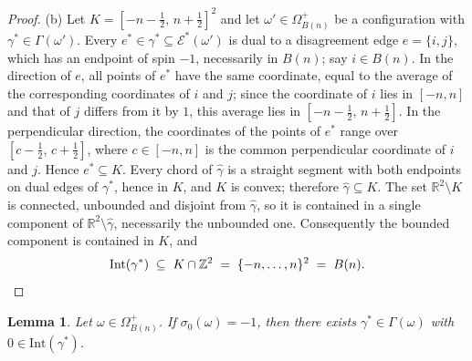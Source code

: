 \documentclass[11pt]{article}
\theoremstyle{plain}
\newtheorem{lemma}[theorem]{Lemma}
\theoremstyle{definition}
\theoremstyle{remark}
\newcommand{\Z}{\mathbb{Z}}
\newcommand{\R}{\mathbb{R}}
\newcommand{\sg}{\sigma}
\newcommand{\Intr}{\mathrm{Int}}    %
\newcommand{\Gam}{\Gamma}           %
\newcommand{\dedges}{\mathscr{E}^*} %
\begin{document}
\begin{proof}
(b) Let $K=[-n-\tfrac12,\,n+\tfrac12]^2$ and let
$\omega'\in\Omega^{+}_{B(n)}$ be a configuration with
$\gamma^*\in\Gam(\omega')$. Every $e^*\in\gamma^*\subseteq\dedges(\omega')$
is dual to a disagreement edge $e=\{i,j\}$, which has an endpoint of spin
$-1$, necessarily in $B(n)$; say $i\in B(n)$. In the direction of $e$, all
points of $e^*$ have the same coordinate, equal to the average of the
corresponding coordinates of $i$ and $j$; since the coordinate of $i$ lies
in $[-n,n]$ and that of $j$ differs from it by $1$, this average lies in
$[-n-\tfrac12,\,n+\tfrac12]$. In the perpendicular direction, the
coordinates of the points of $e^*$ range over $[c-\tfrac12,\,c+\tfrac12]$,
where $c\in[-n,n]$ is the common perpendicular coordinate of $i$ and $j$.
Hence $e^*\subseteq K$. Every chord of $\widehat\gamma$ is a straight
segment with both endpoints on dual edges of $\gamma^*$, hence in $K$, and
$K$ is convex; therefore $\widehat\gamma\subseteq K$. The set
$\R^2\setminus K$ is connected, unbounded and disjoint from
$\widehat\gamma$, so it is contained in a single component of
$\R^2\setminus\widehat\gamma$, necessarily the unbounded one. Consequently
the bounded component is contained in $K$, and
\[
  \Intr(\gamma^*)\;\subseteq\;K\cap\Z^2\;=\;\{-n,\dots,n\}^2\;=\;B(n).
  \qedhere
\]
\end{proof}

\begin{lemma}\label{lem:surround}
Let $\omega\in\Omega^{+}_{B(n)}$. If $\sg_0(\omega)=-1$, then there exists
$\gamma^*\in\Gam(\omega)$ with $0\in\Intr(\gamma^*)$.
\end{lemma}
\end{document}
